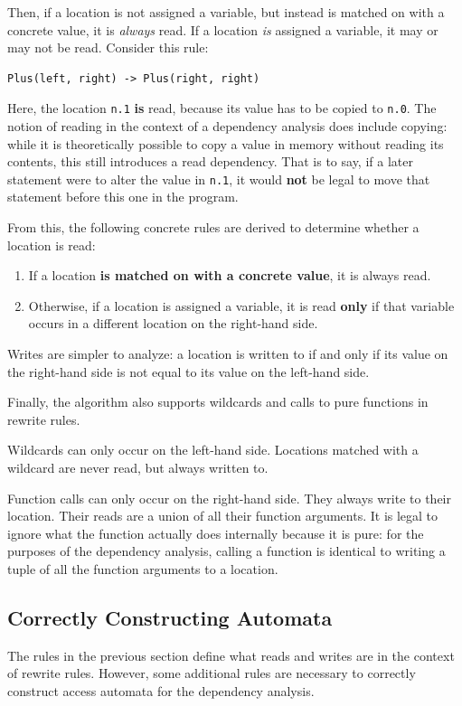 Then, if a location is not assigned a variable, but instead is matched on with a concrete value, it is \textit{always} read. If a location \textit{is} assigned a variable, it may or may not be read. Consider this rule:
\begin{lstlisting}[style = mystyle_ex_stratego_program]
    Plus(left, right) -> Plus(right, right)
\end{lstlisting}

Here, the location \texttt{n.1} \textbf{is} read, because its value has to be copied to \texttt{n.0}. The notion of reading in the context of a dependency analysis does include copying: while it is theoretically possible to copy a value in memory without reading its contents, this still introduces a read dependency. That is to say, if a later statement were to alter the value in \texttt{n.1}, it would \textbf{not} be legal to move that statement before this one in the program.

From this, the following concrete rules are derived to determine whether a location is read:
\begin{enumerate}
    \item If a location \textbf{is matched on with a concrete value}, it is always read.
    \item Otherwise, if a location is assigned a variable, it is read \textbf{only} if that variable occurs in a different location on the right-hand side.
\end{enumerate}

Writes are simpler to analyze: a location is written to if and only if its value on the right-hand side is not equal to its value on the left-hand side.

Finally, the algorithm also supports wildcards and calls to pure functions in rewrite rules.

Wildcards can only occur on the left-hand side. Locations matched with a wildcard are never read, but always written to.

Function calls can only occur on the right-hand side. They always write to their location. Their reads are a union of all their function arguments. It is legal to ignore what the function actually does internally because it is pure: for the purposes of the dependency analysis, calling a function is identical to writing a tuple of all the function arguments to a location.

\subsection{Correctly Constructing Automata}
The rules in the previous section define what reads and writes are in the context of rewrite rules. However, some additional rules are necessary to correctly construct access automata for the dependency analysis.

